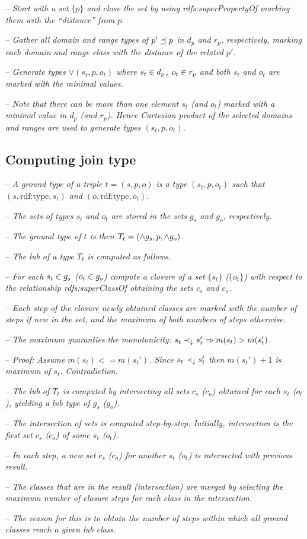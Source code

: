 \documentclass[runningheads]{llncs}
\newcommand{\darr}{\downarrow}
\newcommand{\notes}[1]{\noindent\begin{small}-- \emph{#1}\hfill\break\end{small}}
\newcommand{\nnotes}[1]{\indent\begin{small}-- \emph{#1}\hfill\break\end{small}}
\begin{document}
\notes{Start with a set $\{p\}$ and close the set by using rdfs:superPropertyOf marking them with the ``distance'' from $p$.}
\nnotes{Gather all domain and range types of $p'\preceq\/p$ in $d_p$ and $r_p$, respectively, marking each domain and range class with the distance of the related $p'$.}
\nnotes{Generate types $\lor(s_t,p,o_t)$ where $s_t\in\/d_p$, $o_t\in\/r_p$ and both $s_t$ and $o_t$ are marked with the minimal values.}
\nnotes{Note that there can be more than one element $s_t$ (and $o_t$) marked with a minimal value in $d_p$ (and $r_p$). Hence Cartesian product of the selected domains and ranges are used to generate types $(s_t,p,o_t)$. }






\subsection{Computing join type\label{sec:alg-join}}

\notes{A ground type of a triple $t=(s,p,o)$ is a type $(s_t,p,o_t)$ such that $(s,\text{rdf:type},s_t)$ and $(o,\text{rdf:type},o_t)$.}
\notes{The sets of types $s_t$ and $o_t$ are stored in the sets $g_s$ and $g_o$, respectively.}
\notes{The ground type of $t$ is then $T_t=(\land\/g_s,p,\land\/g_o)$.}
\notes{The lub of a type $T_t$ is computed as follows.}

\notes{For each $s_t\in\/g_s$ ($o_t\in\/g_o$) compute a closure of a set $\{s_t\}$ ($\{o_t\}$) with respect to the relationship rdfs:superClassOf obtaining the sets $c_s$ and $c_o$.}
\notes{Each step of the closure newly obtained classes are marked with the number of steps if new in the set, and the maximum of both numbers of steps otherwise.}
\notes{The maximum guaranties the monotonicity: $s_t\prec_\darr\/s_t'\Rightarrow\/m(s_t)>m(s_t')$.}
\notes{Proof: Assume $m(s_t)<=m(s_t')$. Since $s_t\prec_\darr\/s_t'$ then $m(s_t')+1$ is maximum of $s_t$. Contradiction.}

\notes{The lub of $T_t$ is computed by intersecting all sets $c_s$ ($c_o$) obtained for each $s_t$ ($o_t$), yielding a lub type of $g_s$ ($g_o$).}
\notes{The intersection of sets is computed step-by-step. Initially, intersection is the first set $c_s$ ($c_o$) of some $s_t$ ($o_t$).}
\notes{In each step, a new set $c_s$ ($c_o$) for another $s_t$ ($o_t$) is intersected with previous result.}
\notes{The classes that are in the result (intersection) are merged by selecting the maximum number of closure steps for each class in the intersection.}
\notes{The reason for this is to obtain the number of steps within which all ground classes reach a given lub class.}
\end{document}
